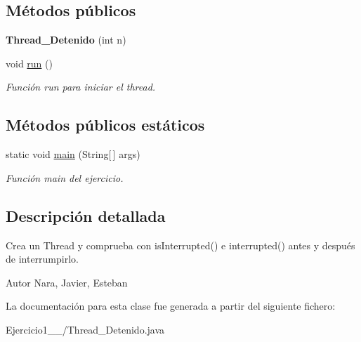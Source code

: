 \subsection*{Métodos públicos}
\begin{DoxyCompactItemize}
\item 
\hypertarget{class_ejercicio1__3__2_1_1_thread___detenido_a6be43334720506b0cc43c8020caef6e8}{}{\bfseries Thread\+\_\+\+Detenido} (int n)\label{class_ejercicio1__3__2_1_1_thread___detenido_a6be43334720506b0cc43c8020caef6e8}

\item 
\hypertarget{class_ejercicio1__3__2_1_1_thread___detenido_a0d8e2160e3d5841b707dec80edf4da66}{}void \hyperlink{class_ejercicio1__3__2_1_1_thread___detenido_a0d8e2160e3d5841b707dec80edf4da66}{run} ()\label{class_ejercicio1__3__2_1_1_thread___detenido_a0d8e2160e3d5841b707dec80edf4da66}

\begin{DoxyCompactList}\small\item\em Función run para iniciar el thread. \end{DoxyCompactList}\end{DoxyCompactItemize}
\subsection*{Métodos públicos estáticos}
\begin{DoxyCompactItemize}
\item 
\hypertarget{class_ejercicio1__3__2_1_1_thread___detenido_ae18c982e481fc76e3d53e6f7220457f2}{}static void \hyperlink{class_ejercicio1__3__2_1_1_thread___detenido_ae18c982e481fc76e3d53e6f7220457f2}{main} (String\mbox{[}$\,$\mbox{]} args)\label{class_ejercicio1__3__2_1_1_thread___detenido_ae18c982e481fc76e3d53e6f7220457f2}

\begin{DoxyCompactList}\small\item\em Función main del ejercicio. \end{DoxyCompactList}\end{DoxyCompactItemize}


\subsection{Descripción detallada}
Crea un Thread y comprueba con is\+Interrupted() e interrupted() antes y después de interrumpirlo. 

\begin{DoxyAuthor}{Autor}
Nara, Javier, Esteban 
\end{DoxyAuthor}


La documentación para esta clase fue generada a partir del siguiente fichero\+:\begin{DoxyCompactItemize}
\item 
Ejercicio1\+\_\+\_/Thread\+\_\+\+Detenido.\+java\end{DoxyCompactItemize}
